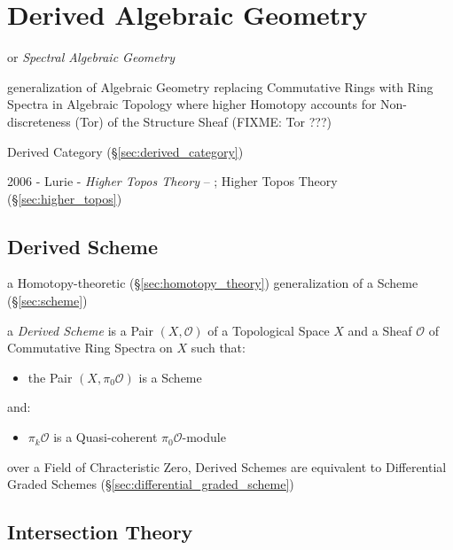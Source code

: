 \section{Derived Algebraic Geometry}\label{sec:derived_algebraic_geometry}

or \emph{Spectral Algebraic Geometry}

generalization of Algebraic Geometry replacing Commutative Rings with Ring
Spectra in Algebraic Topology where higher Homotopy accounts for
Non-discreteness (Tor) of the Structure Sheaf
(FIXME: Tor ???)

Derived Category (\S\ref{sec:derived_category})

2006 - Lurie - \emph{Higher Topos Theory}
-- ; \fist Higher Topos Theory (\S\ref{sec:higher_topos})



\subsection{Derived Scheme}\label{sec:derived_scheme}

a Homotopy-theoretic (\S\ref{sec:homotopy_theory}) generalization of a Scheme
(\S\ref{sec:scheme})

a \emph{Derived Scheme} is a Pair $(X, \mathcal{O})$ of a Topological Space $X$
and a Sheaf $\mathcal{O}$ of Commutative Ring Spectra on $X$ such that:
\begin{itemize}
\item the Pair $(X, \pi_0\mathcal{O})$ is a Scheme
\end{itemize}
and:
\begin{itemize}
\item $\pi_k\mathcal{O}$ is a Quasi-coherent $\pi_0\mathcal{O}$-module
\end{itemize}

over a Field of Chracteristic Zero, Derived Schemes are equivalent to
Differential Graded Schemes (\S\ref{sec:differential_graded_scheme})



\subsection{Intersection Theory}\label{sec:intersection_theory}

